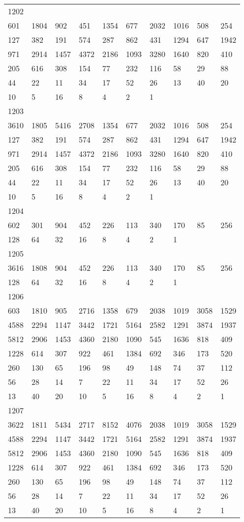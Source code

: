 \begin{longtable}{*{10}{l}}
1202&&&&&&&&&\\
601& 1804& 902& 451& 1354& 677& 2032& 1016& 508& 254\\
127& 382& 191& 574& 287& 862& 431& 1294& 647& 1942\\
971& 2914& 1457& 4372& 2186& 1093& 3280& 1640& 820& 410\\
205& 616& 308& 154& 77& 232& 116& 58& 29& 88\\
44& 22& 11& 34& 17& 52& 26& 13& 40& 20\\
10& 5& 16& 8& 4& 2& 1& \\

1203&&&&&&&&&\\
3610& 1805& 5416& 2708& 1354& 677& 2032& 1016& 508& 254\\
127& 382& 191& 574& 287& 862& 431& 1294& 647& 1942\\
971& 2914& 1457& 4372& 2186& 1093& 3280& 1640& 820& 410\\
205& 616& 308& 154& 77& 232& 116& 58& 29& 88\\
44& 22& 11& 34& 17& 52& 26& 13& 40& 20\\
10& 5& 16& 8& 4& 2& 1& \\

1204&&&&&&&&&\\
602& 301& 904& 452& 226& 113& 340& 170& 85& 256\\
128& 64& 32& 16& 8& 4& 2& 1& \\

1205&&&&&&&&&\\
3616& 1808& 904& 452& 226& 113& 340& 170& 85& 256\\
128& 64& 32& 16& 8& 4& 2& 1& \\

1206&&&&&&&&&\\
603& 1810& 905& 2716& 1358& 679& 2038& 1019& 3058& 1529\\
4588& 2294& 1147& 3442& 1721& 5164& 2582& 1291& 3874& 1937\\
5812& 2906& 1453& 4360& 2180& 1090& 545& 1636& 818& 409\\
1228& 614& 307& 922& 461& 1384& 692& 346& 173& 520\\
260& 130& 65& 196& 98& 49& 148& 74& 37& 112\\
56& 28& 14& 7& 22& 11& 34& 17& 52& 26\\
13& 40& 20& 10& 5& 16& 8& 4& 2& 1\\

1207&&&&&&&&&\\
3622& 1811& 5434& 2717& 8152& 4076& 2038& 1019& 3058& 1529\\
4588& 2294& 1147& 3442& 1721& 5164& 2582& 1291& 3874& 1937\\
5812& 2906& 1453& 4360& 2180& 1090& 545& 1636& 818& 409\\
1228& 614& 307& 922& 461& 1384& 692& 346& 173& 520\\
260& 130& 65& 196& 98& 49& 148& 74& 37& 112\\
56& 28& 14& 7& 22& 11& 34& 17& 52& 26\\
13& 40& 20& 10& 5& 16& 8& 4& 2& 1\\


\end{longtable}
